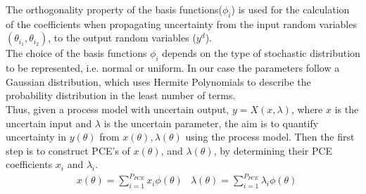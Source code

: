 The orthogonality property of the basis functions($\phi_{i}$) is used for the  calculation of the coefficients when propagating uncertainty from the input random variables$(\theta_{i_{1}}, \theta_{i_{2}})$, to the output random
variables ($y^{d}$).\\
The choice of the basis functions $\phi_{i}$ depends on the type of stochastic distribution to be represented, i.e. normal or uniform. In our case the parameters follow a Gaussian distribution\cite{yenkie}, which uses Hermite Polynomials to describe the probability distribution in the least number of terms.\\
Thus, given a process model with uncertain output, $y = X(x,\lambda)$, where $x$ is the uncertain input and $\lambda$ is the uncertain parameter, the aim is to quantify uncertainty in $y(\theta)$ from $x(\theta), \lambda(\theta)$ using the process model. Then the first step is to construct PCE’s of $x(\theta)$, and $\lambda(\theta)$, by determining their PCE coefficients $x_{i}$ and $\lambda_{i}$.
\begin{align}
&x(\theta) = \sum_{i=1}^{P_{PCE}} x_{i}\phi(\theta)
&\lambda(\theta) = \sum_{i=1}^{P_{PCE}} \lambda_{i}\phi(\theta)
\end{align}
